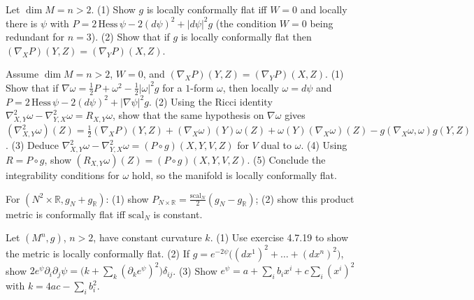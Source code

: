 \begin{remark}
  \label{rem:pet-ch4-ex-18}
  Let $\dim M=n>2$. (1) Show $g$ is locally conformally flat iff $W=0$ and
  locally there is $\psi$ with
  $P=2\,\mathrm{Hess}\,\psi-2(d\psi)^2+|d\psi|^2g$ (the condition $W=0$ being
  redundant for $n=3$). (2) Show that if $g$ is locally conformally flat then
  $(\nabla_XP)(Y,Z)=(\nabla_YP)(X,Z)$.
\end{remark}

\begin{remark}
  \label{rem:pet-ch4-ex-19}
  Assume $\dim M=n>2$, $W=0$, and $(\nabla_XP)(Y,Z)=(\nabla_YP)(X,Z)$. (1) Show
  that if $\nabla\omega=\tfrac12P+\omega^2-\tfrac12|\omega|^2g$ for a $1$-form
  $\omega$, then locally $\omega=d\psi$ and
  $P=2\,\mathrm{Hess}\,\psi-2(d\psi)^2+|\nabla\psi|^2g$. (2) Using the Ricci
  identity $\nabla^2_{X,Y}\omega-\nabla^2_{Y,X}\omega=R_{X,Y}\omega$, show that
  the same hypothesis on $\nabla\omega$ gives
  $(\nabla^2_{X,Y}\omega)(Z)=\tfrac12(\nabla_XP)(Y,Z)+(\nabla_X\omega)(Y)\omega(Z)+\omega(Y)(\nabla_X\omega)(Z)-g(\nabla_X\omega,\omega)g(Y,Z)$.
  (3) Deduce $\nabla^2_{X,Y}\omega-\nabla^2_{Y,X}\omega=(P\circ g)(X,Y,V,Z)$ for
  $V$ dual to $\omega$. (4) Using $R=P\circ g$, show
  $(R_{X,Y}\omega)(Z)=(P\circ g)(X,Y,V,Z)$. (5) Conclude the integrability
  conditions for $\omega$ hold, so the manifold is locally conformally flat.
\end{remark}

\begin{remark}
  \label{rem:pet-ch4-ex-20}
  For $(N^2\times\mathbb{R},g_N+g_{\mathbb{R}})$: (1) show
  $P_{N\times\mathbb{R}}=\tfrac{\mathrm{scal}_N}2(g_N-g_{\mathbb{R}})$; (2) show this product
  metric is conformally flat iff $\mathrm{scal}_N$ is constant.
\end{remark}

\begin{remark}
  \label{rem:pet-ch4-ex-21}
  Let $(M^n,g)$, $n>2$, have constant curvature $k$. (1) Use exercise 4.7.19
  to show the metric is locally conformally flat. (2) If
  $g=e^{-2\psi}\big((dx^1)^2+\dots+(dx^n)^2\big)$, show
  $2e^\psi\partial_i\partial_j\psi=\big(k+\sum_k(\partial_ke^\psi)^2\big)\delta_{ij}$.
  (3) Show $e^\psi=a+\sum_ib_ix^i+c\sum_i(x^i)^2$ with $k=4ac-\sum_ib_i^2$.
\end{remark}

